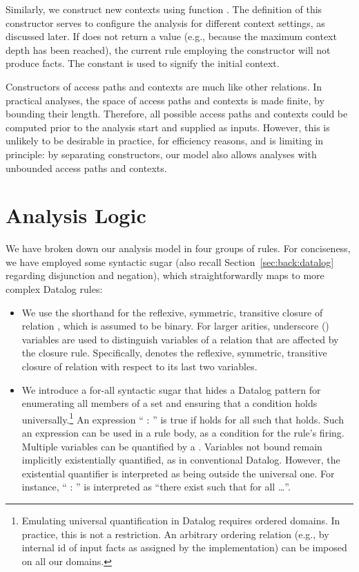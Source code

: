 Similarly, we construct new contexts using function . The definition of this constructor serves to configure the analysis for different context settings, as discussed later. If  does not return a value (e.g., because the maximum context depth has been reached), the current rule employing the constructor will not produce facts. The constant \ctxAll{} is used to signify the initial context.

Constructors of access paths and contexts are much like other relations. In practical analyses, the space of access paths and contexts is made finite, by bounding their length. Therefore, all possible access paths and contexts could be computed prior to the analysis start and supplied as inputs. However, this is unlikely to be desirable in practice, for efficiency reasons, and is limiting in principle: by separating constructors, our model also allows analyses with unbounded access paths and contexts.


\section{Analysis Logic}

We have broken down our analysis model in four groups of rules. For conciseness, we have employed some syntactic sugar (also recall Section~\ref{sec:back:datalog} regarding disjunction and negation), which straightforwardly maps to more complex Datalog rules:

\begin{itemize}
\item We use the shorthand  for the reflexive, symmetric, transitive closure of relation , which is assumed to be binary. For larger arities, underscore (\args{\_}) variables are used to distinguish variables of a relation that are affected by the closure rule. Specifically,  denotes the reflexive, symmetric, transitive closure of relation  with respect to its last two variables.

\item We introduce a for-all syntactic sugar that hides a Datalog pattern for enumerating all members of a set and ensuring that a condition holds universally.\footnote{Emulating universal quantification in Datalog requires ordered domains. In practice, this is not a restriction. An arbitrary ordering relation (e.g., by internal id of input facts as assigned by the implementation) can be imposed on all our domains.} An expression ``\dlforall{} :  \dlThen{} '' is true if  holds for all  such that  holds. Such an expression can be used in a rule body, as a condition for the rule's firing. Multiple variables can be quantified by a \dlforall{}. Variables not bound remain implicitly existentially quantified, as in conventional Datalog. However, the existential quantifier is interpreted as being outside the universal one. For instance, ``\dlforall{} :  \dlThen{} '' is interpreted as ``there exist  such that for all  \ldots''.
\end{itemize}


